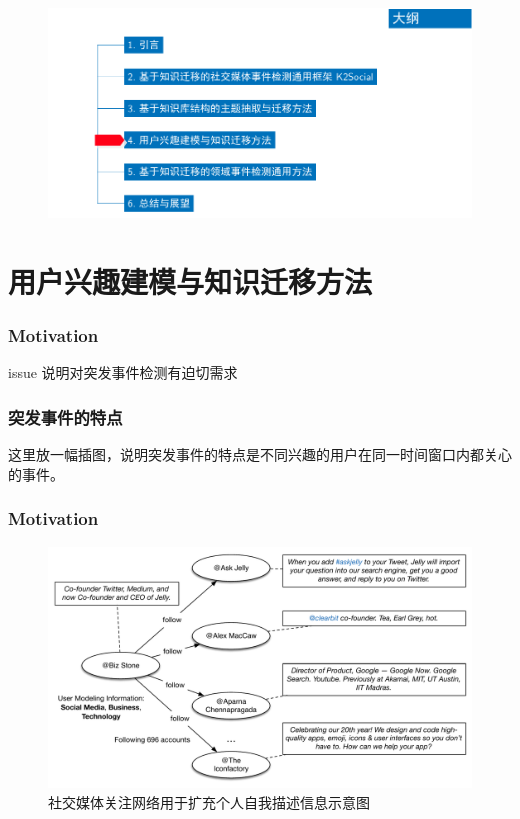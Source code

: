 \begin{withoutheadline}
\begin{frame}
\vspace*{-13mm}
\begin{figure}
	\hspace*{-4.2mm}
    \includegraphics[width=1.0\paperwidth]{img/contents4_output.pdf}
\end{figure}

\end{frame}
\end{withoutheadline}

\section{用户兴趣建模与知识迁移方法}


\begin{frame}
\frametitle{Motivation}	
issue
说明对突发事件检测有迫切需求

\end{frame}

\begin{frame}
\frametitle{突发事件的特点}
这里放一幅插图，说明突发事件的特点是不同兴趣的用户在同一时间窗口内都关心的事件。
\end{frame}


\begin{frame}
\frametitle{Motivation}
\begin{figure}[h]
		\setlength{\abovecaptionskip}{0.cm}
        \setlength{\belowcaptionskip}{0.cm}
        \centering
		\caption{社交媒体关注网络用于扩充个人自我描述信息示意图}
        \includegraphics[width=0.9\columnwidth]{img/UMIETM/UMIETM_profile.pdf}
\end{figure}
\end{frame}


